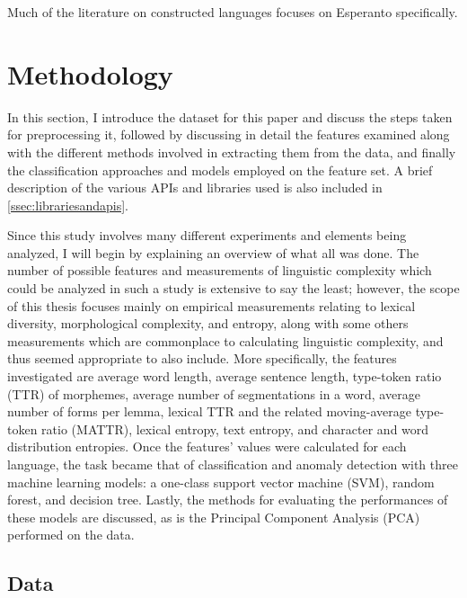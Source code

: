 \documentclass[12pt,a4paper]{article}
\numberwithin{figure}{section}
\numberwithin{table}{section}
\numberwithin{definition}{section}
\begin{document}
Much of the literature on constructed languages focuses on Esperanto specifically.


\newpage
\section{Methodology}
\label{sec:methodology}

In this section, I introduce the dataset for this paper and discuss the steps taken for preprocessing it, followed by discussing in detail the features examined along with the different methods involved in extracting them from the data, and finally the classification approaches and models employed on the feature set. A brief description of the various APIs and libraries used is also included in \ref{ssec:librariesandapis}. 

Since this study involves many different experiments and elements being analyzed, I will begin by explaining an overview of what all was done. The number of possible features and measurements of linguistic complexity which could be analyzed in such a study is extensive to say the least; however, the scope of this thesis focuses mainly on empirical measurements relating to lexical diversity, morphological complexity, and entropy, along with some others measurements which are commonplace to calculating linguistic complexity, and thus seemed appropriate to also include. More specifically, the features investigated are average word length, average sentence length, type-token ratio (TTR) of morphemes, average number of segmentations in a word, average number of forms per lemma, lexical TTR and the related moving-average type-token ratio (MATTR), lexical entropy, text entropy, and character and word distribution entropies. Once the features' values were calculated for each language, the task became that of classification and anomaly detection with three machine learning models: a one-class support vector machine (SVM), random forest, and decision tree. Lastly, the methods for evaluating the performances of these models are discussed, as is the Principal Component Analysis (PCA) performed on the data.

\subsection{Data}
\label{ssec:data}
\end{document}
